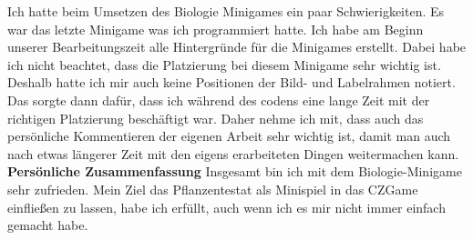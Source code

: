 Ich hatte beim Umsetzen des Biologie Minigames ein paar Schwierigkeiten. Es war das letzte Minigame was ich programmiert hatte. Ich habe am Beginn unserer Bearbeitungszeit alle Hintergründe für die Minigames erstellt. Dabei habe ich nicht beachtet, dass die Platzierung bei diesem Minigame sehr wichtig ist. Deshalb hatte ich mir auch keine Positionen der Bild- und Labelrahmen notiert.
Das sorgte dann dafür, dass ich während des codens eine lange Zeit mit der richtigen Platzierung beschäftigt war. Daher nehme ich mit, dass auch das persönliche \glqq{}Kommentieren\grqq{} der eigenen Arbeit sehr wichtig ist, damit man auch nach etwas längerer Zeit mit den eigens erarbeiteten Dingen weitermachen kann.
\textbf{Persönliche Zusammenfassung}
Insgesamt bin ich mit dem Biologie-Minigame sehr zufrieden. Mein Ziel das Pflanzentestat als Minispiel in das CZGame einfließen zu lassen, habe ich erfüllt, auch wenn ich es mir nicht immer einfach gemacht habe.